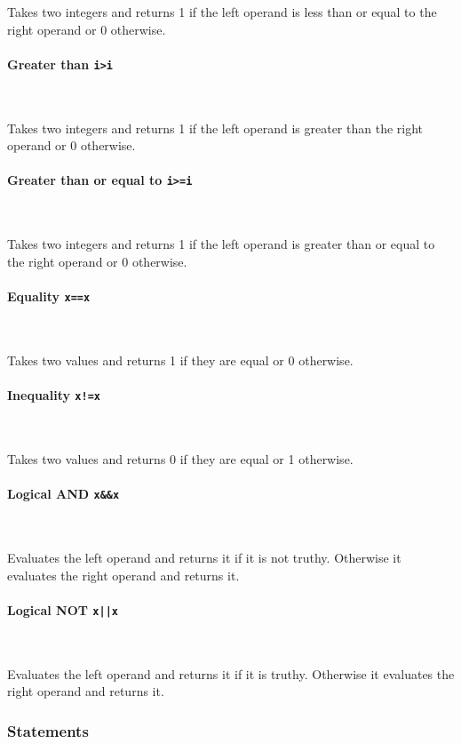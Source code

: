 Takes two integers and returns 1 if the left operand is less than or equal to the right operand or 0 otherwise.

\paragraph{Greater than \quad \texttt{i>i}} \

Takes two integers and returns 1 if the left operand is greater than the right operand or 0 otherwise.

\paragraph{Greater than or equal to \quad \texttt{i>=i}} \

Takes two integers and returns 1 if the left operand is greater than or equal to the right operand or 0 otherwise.

\paragraph{Equality \quad \texttt{x==x}} \

Takes two values and returns 1 if they are equal or 0 otherwise.

\paragraph{Inequality \quad \texttt{x!=x}} \

Takes two values and returns 0 if they are equal or 1 otherwise.

\paragraph{Logical AND \quad \texttt{x\&\&x}} \

Evaluates the left operand and returns it if it is not truthy. Otherwise it evaluates the right operand and returns it.

\paragraph{Logical NOT \quad \texttt{x||x}} \

Evaluates the left operand and returns it if it is truthy. Otherwise it evaluates the right operand and returns it.

\subsubsection{Statements}

